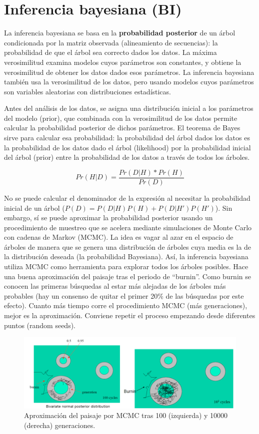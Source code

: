 \chapter{Inferencia bayesiana (BI)}
La inferencia bayesiana se basa en la \textbf{probabilidad posterior} de un árbol condicionada por la matriz observada (alineamiento de secuencias): la probabilidad de que el árbol sea correcto dados los datos. La máxima verosimilitud examina modelos cuyos parámetros son constantes, y obtiene la verosimilitud de obtener los datos dados esos parámetros. La inferencia bayesiana también usa la verosimilitud de los datos, pero usando modelos cuyos parámetros son variables aleatorias con distribuciones estadísticas. 

Antes del análisis de los datos, se asigna una distribución inicial a los parámetros del modelo (prior), que combinada con la verosimilitud de los datos permite calcular la probabilidad posterior de dichos parámetros. El teorema de Bayes sirve para calcular esa probabilidad: la probabilidad del árbol dados los datos es la probabilidad de los datos dado el árbol (likelihood) por la probabilidad inicial del árbol (prior) entre la probabilidad de los datos a través de todos los árboles.

$$ Pr(H|D) = \frac{Pr(D|H) * Pr(H)}{Pr(D)}$$

No se puede calcular el denominador de la expresión al necesitar la probabilidad inicial de un árbol ($P(D) = P(D|H) P(H) + P(D|H')P(H')$). Sin embargo, sí se puede aproximar la probabilidad posterior usando un procedimiento de muestreo que se acelera mediante simulaciones de Monte Carlo con cadenas de Markov (MCMC). La idea es vagar al azar en el espacio de árboles de manera que se genera una distribución de árboles cuya media es la de la distribución deseada (la probabilidad Bayesiana). Así, la inferencia bayesiana utiliza MCMC como herramienta para explorar todos los árboles posibles. Hace una buena aproximación del paisaje tras el periodo de “burnin”. Como burnin se conocen las primeras búsquedas al estar más alejadas de los árboles más probables (hay un consenso de quitar el primer 20\% de las búsquedas por este efecto). Cuanto más tiempo corre el procedimiento MCMC (más generaciones), mejor es la aproximación. Conviene repetir el proceso empezando desde diferentes puntos (random seeds).

\begin{figure}[htbp]
\centering
\includegraphics[width=0.5\linewidth]{figs/mcmc.png}
\caption{Aproximación del paisaje por MCMC tras 100 (izquierda) y 10000 (derecha) generaciones.}
\end{figure}

